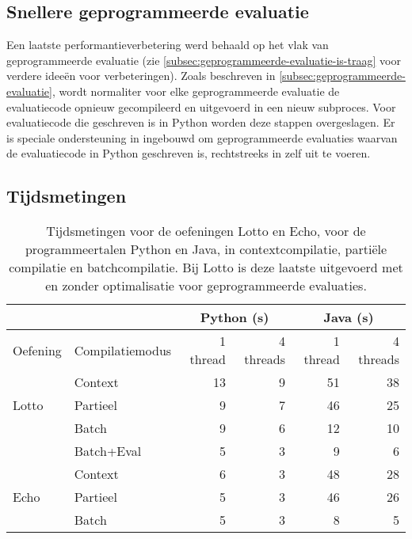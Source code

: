 \subsection{Snellere geprogrammeerde evaluatie}\label{subsec:snellere-geprogrammeerde-evaluatie}

Een laatste performantieverbetering werd behaald op het vlak van geprogrammeerde evaluatie (zie \cref{subsec:geprogrammeerde-evaluatie-is-traag} voor verdere ideeën voor verbeteringen).
Zoals beschreven in \cref{subsec:geprogrammeerde-evaluatie}, wordt normaliter voor elke geprogrammeerde evaluatie de evaluatiecode opnieuw gecompileerd en uitgevoerd in een nieuw subproces.
Voor evaluatiecode die geschreven is in Python worden deze stappen overgeslagen.
Er is speciale ondersteuning in \tested{} ingebouwd om geprogrammeerde evaluaties waarvan de evaluatiecode in Python geschreven is, rechtstreeks in \tested{} zelf uit te voeren.

\subsection{Tijdsmetingen}\label{subsec:tijdsmetingen}

\begin{table}
    \caption{Tijdsmetingen voor de oefeningen Lotto en Echo, voor de programmeertalen Python en Java, in contextcompilatie, partiële compilatie en batchcompilatie.
    Bij Lotto is deze laatste uitgevoerd met en zonder optimalisatie voor geprogrammeerde evaluaties.}
    \label{tab:meting}
    \centering
    \begin{tabular}{ll|r|r|r|r|}
        \cline{3-6}
        & & \multicolumn{2}{c|}{Python (s)} & \multicolumn{2}{c|}{Java (s)}  \\
        \hline
        \multicolumn{1}{|l|}{Oefening}               & Compilatiemodus  & 1 thread & 4 threads & 1 thread & 4 threads \\
        \hline
        \multicolumn{1}{|l|}{\multirow{3}{*}{Lotto}} & Context          & 13       & 9         & 51       & 38        \\
        \multicolumn{1}{|l|}{}                       & Partieel         & 9        & 7         & 46       & 25        \\
        \multicolumn{1}{|l|}{}                       & Batch            & 9        & 6         & 12       & 10        \\
        \multicolumn{1}{|l|}{}                       & Batch+Eval       & 5        & 3         & 9        & 6         \\
        \hline
        \multicolumn{1}{|l|}{\multirow{3}{*}{Echo}}  & Context           & 6        & 3         & 48       & 28        \\
        \multicolumn{1}{|l|}{}                       & Partieel          & 5        & 3         & 46       & 26        \\
        \multicolumn{1}{|l|}{}                       & Batch             & 5        & 3         & 8        & 5         \\
        \hline
    \end{tabular}
\end{table}


